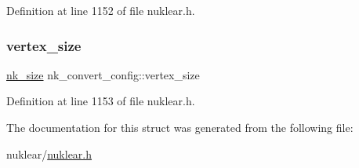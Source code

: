 Definition at line 1152 of file nuklear.\+h.

\mbox{\label{structnk__convert__config_acf0d9e08220c6e29ee9d2753f9273591}} 
\subsubsection{\texorpdfstring{vertex\+\_\+size}{vertex\_size}}
{\footnotesize\ttfamily \mbox{\hyperlink{nuklear_8h_a84c0fc50dec5501be327b33d41d9010c}{nk\+\_\+size}} nk\+\_\+convert\+\_\+config\+::vertex\+\_\+size}



Definition at line 1153 of file nuklear.\+h.



The documentation for this struct was generated from the following file\+:\begin{DoxyCompactItemize}
\item 
nuklear/\mbox{\hyperlink{nuklear_8h}{nuklear.\+h}}\end{DoxyCompactItemize}
